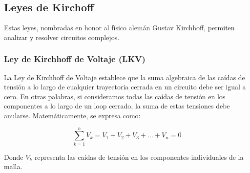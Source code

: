 \subsection{Leyes de Kirchoff}

Estas leyes, nombradas en honor al físico alemán Gustav Kirchhoff, permiten analizar y resolver circuitos complejos.

\subsubsection{Ley de Kirchhoff de Voltaje (LKV)}

La Ley de Kirchhoff de Voltaje establece que la suma algebraica de las caídas de tensión a lo largo de cualquier trayectoria cerrada en un circuito debe ser igual a cero. En otras palabras, si consideramos todas las caídas de tensión en los componentes a lo largo de un loop cerrado, la suma de estas tensiones debe anularse. Matemáticamente, se expresa como:

\begin{equation*}
\sum_{k=1}^{n} V_k = V_1 + V_2 + V_3 + \ldots + V_n = 0
\end{equation*}

Donde \(V_k\) representa las caídas de tensión en los componentes individuales de la malla.



